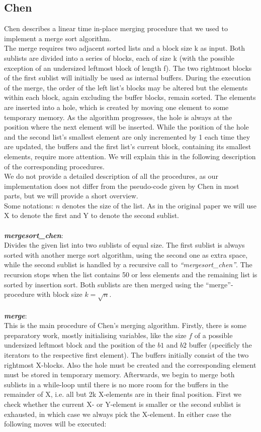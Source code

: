 \documentclass[11pt,pdftex,a4paper, twocolumn]{article}
\begin{document}
\subsection*{Chen}
Chen describes a linear time in-place merging procedure that we used to implement a merge sort algorithm. \\
The merge requires two adjacent sorted lists and a block size k as input. Both sublists are divided into a series of blocks, each of size k (with the possible exception of an undersized leftmost block of length f). The two rightmost blocks of the first sublist will initially be used as internal buffers. During the execution of the merge, the order of the left list's blocks may be altered but the elements within each block, again excluding the buffer blocks, remain sorted. The elements are inserted into a hole, which is created by moving one element to some temporary memory. As the algorithm progresses, the hole is always at the position where the next element will be inserted. While the position of the hole and the second list’s smallest element are only incremented by 1 each time they are updated, the buffers and the first list’s current block, containing its smallest elements, require more attention. We will explain this in the following description of the corresponding procedures. \\
We do not provide a detailed description of all the procedures, as our implementation does not differ from the pseudo-code given by Chen in most parts, but we will provide a short overview. \\
Some notations: $n$ denotes the size of the list. As in the original paper we will use X to denote the first and Y to denote the second sublist. \\
$ $ \\
\textbf{\textit{mergesort\_chen}}: \\
Divides the given list into two sublists of equal size. The first sublist is always sorted with another merge sort algorithm, using the second one as extra space, while the second sublist is handled by a recursive call to \textit{“mergesort\_chen”}. The recursion stops when the list contains 50 or less elements and the remaining list is sorted by insertion sort.  Both sublists are then merged using the “merge”-procedure with block size $k=\sqrt{n}$. \\
$ $ \\
\textbf{\textit{merge}}: \\
This is the main procedure of Chen’s merging algorithm. Firstly, there is some preparatory work, mostly initialising variables, like the size $f$ of a possible undersized leftmost block and the position of the $b1$ and $b2$ buffer (specificly the iterators to the respective first element). The buffers initially consist of the two rightmost X-blocks. Also the hole must be created and the corresponding element must be stored in temporary memory. Afterwards, we begin to merge both sublists in a while-loop until there is no more room for the buffers in the remainder of X, i.e. all but 2k X-elements are in their final position. First we check whether the current X- or Y-element is smaller or the second sublist is exhausted, in which case we always pick the X-element. In either case the following moves will be executed: \\
\end{document}

